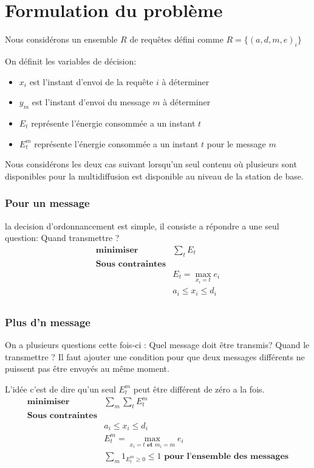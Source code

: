 \documentclass[runningheads]{llncs}
\begin{document}
\section{Formulation du problème}
Nous considérons un ensemble $R$ de requêtes défini comme 
$R = \{(a, d, m, e )_i\} $ 


On définit les variables de décision:
\begin{itemize}
    \item $x_i$ est l'instant d'envoi de la requête $i$ à  déterminer 
    \item $y_m$ est l'instant d'envoi du message  $m$ à  déterminer 
    \item $E_t$ représente l'énergie consommée a un instant $t$
    \item $E_t^m$ représente l'énergie consommée a un instant $t$ pour 
    le message $m$
\end{itemize}

Nous consid\'erons les deux cas suivant lorsqu'un seul contenu o\`u plusieurs 
sont disponibles pour la multidiffusion est disponible au niveau de la 
station de base.

\subsubsection{Pour un message} la decision d'ordonnancement est simple, il 
consiste a répondre a une seul question: Quand transmettre ?
\[
    \begin{array}{cc}
         \textbf{minimiser} &  \sum\limits_{t} E_t\\
         \textbf{Sous contraintes} & \\
         & E_t = \max\limits_{x_i=t} e_i \\
         & a_i \leq x_i \leq d_i\\
    \end{array}
\] 

\subsubsection{Plus d'n message}
On a plusieurs questions cette fois-ci :
Quel message doit être transmis?  Quand le transmettre ?
Il faut ajouter une condition pour que deux messages différents ne puissent pas être 
envoy\'es au même moment.

L'idée c'est de dire qu'un seul $E_t^m$ peut être différent de zéro a la fois.
\[
    \begin{array}{cc}
         \textbf{minimiser} &  \sum \limits_{m}\sum\limits_{t} E_t^m\\
         \textbf{Sous contraintes} & \\
         & a_i \leq x_i \leq d_i\\
         & E_t^m = \max\limits_{x_i=t \textbf{ et } m_i=m} e_i \\
         & \sum\limits_{m}  1_{ E_t^m\geq 0} \leq 1 \textbf{ pour l'ensemble des messages} \\
    \end{array}
\]
\end{document}
